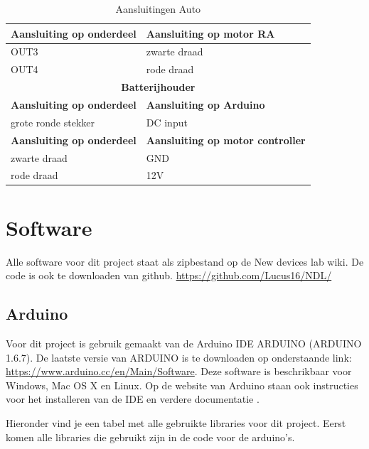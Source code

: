 \documentclass[12pt,a4paper]{article}
\begin{document}
\begin{table}[H]
\begin{tabularx}{\textwidth}{|X|X|}
		\hline \textbf{Aansluiting op onderdeel} & \textbf{Aansluiting op motor RA} \\
		\hline OUT3 & zwarte draad \\
		\hline OUT4 & rode draad \\
		\hline \multicolumn{2}{|c|}{\textbf{Batterijhouder}}\\	 
		\hline \textbf{Aansluiting op onderdeel} & \textbf{Aansluiting op Arduino} \\
		\hline grote ronde stekker & DC input \\
		\hline \textbf{Aansluiting op onderdeel} & \textbf{Aansluiting op motor controller} \\
		\hline zwarte draad & GND \\
		\hline rode draad & 12V \\		
		\hline		
	\end{tabularx} 
	\caption{Aansluitingen Auto}
	\label{tbl:Aansluitingen_auto}
\end{table}

\section{Software}
Alle software voor dit project staat als zipbestand op de New devices lab wiki. De code is ook te downloaden van github.
\url{https://github.com/Lucus16/NDL/}

\subsection{Arduino}
Voor dit project is gebruik gemaakt van de Arduino IDE ARDUINO (ARDUINO 1.6.7). De laatste versie van ARDUINO is te downloaden op onderstaande link: \url{https://www.arduino.cc/en/Main/Software}. Deze software is beschrikbaar voor Windows, Mac OS X en Linux. Op de website van Arduino staan ook instructies voor het installeren van de IDE en verdere documentatie \cite{ARDUINO_getting started}.

Hieronder vind je een tabel met alle gebruikte libraries voor dit project.
Eerst komen alle libraries die gebruikt zijn in de code voor de arduino's.
\end{document}
